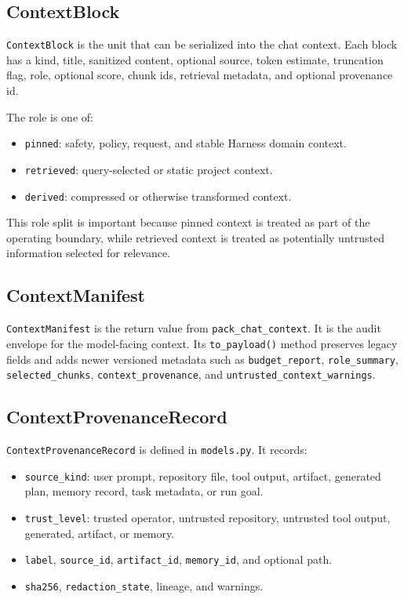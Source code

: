 \documentclass[11pt]{article}
\begin{document}
\subsection{ContextBlock}

\texttt{ContextBlock} is the unit that can be serialized into the chat context. Each block has a kind, title, sanitized content, optional source, token estimate, truncation flag, role, optional score, chunk ids, retrieval metadata, and optional provenance id.

The role is one of:

\begin{itemize}[leftmargin=*]
  \item \texttt{pinned}: safety, policy, request, and stable Harness domain context.
  \item \texttt{retrieved}: query-selected or static project context.
  \item \texttt{derived}: compressed or otherwise transformed context.
\end{itemize}

This role split is important because pinned context is treated as part of the operating boundary, while retrieved context is treated as potentially untrusted information selected for relevance.

\subsection{ContextManifest}

\texttt{ContextManifest} is the return value from \texttt{pack\_chat\_context}. It is the audit envelope for the model-facing context. Its \texttt{to\_payload()} method preserves legacy fields and adds newer versioned metadata such as \texttt{budget\_report}, \texttt{role\_summary}, \texttt{selected\_chunks}, \texttt{context\_provenance}, and \texttt{untrusted\_context\_warnings}.

\subsection{ContextProvenanceRecord}

\texttt{ContextProvenanceRecord} is defined in \texttt{models.py}. It records:

\begin{itemize}[leftmargin=*]
  \item \texttt{source\_kind}: user prompt, repository file, tool output, artifact, generated plan, memory record, task metadata, or run goal.
  \item \texttt{trust\_level}: trusted operator, untrusted repository, untrusted tool output, generated, artifact, or memory.
  \item \texttt{label}, \texttt{source\_id}, \texttt{artifact\_id}, \texttt{memory\_id}, and optional path.
  \item \texttt{sha256}, \texttt{redaction\_state}, lineage, and warnings.
\end{itemize}
\end{document}
